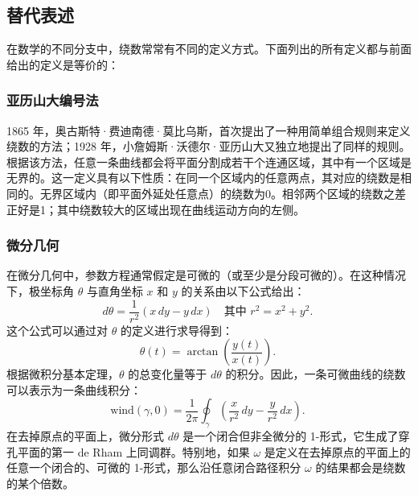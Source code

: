 \subsection{替代表述}
在数学的不同分支中，绕数常常有不同的定义方式。下面列出的所有定义都与前面给出的定义是等价的：
\subsubsection{亚历山大编号法}
1865 年，奥古斯特·费迪南德·莫比乌斯，首次提出了一种用简单组合规则来定义绕数的方法；1928 年，小詹姆斯·沃德尔·亚历山大又独立地提出了同样的规则。根据该方法，任意一条曲线都会将平面分割成若干个连通区域，其中有一个区域是无界的。这一定义具有以下性质：在同一个区域内的任意两点，其对应的绕数是相同的。无界区域内（即平面外延处任意点）的绕数为0。相邻两个区域的绕数之差正好是1；其中绕数较大的区域出现在曲线运动方向的左侧。
\subsubsection{微分几何}
在微分几何中，参数方程通常假定是可微的（或至少是分段可微的）。在这种情况下，极坐标角 $\theta$ 与直角坐标 $x$ 和 $y$ 的关系由以下公式给出：
$$
d\theta = \frac{1}{r^{2}}\left(x\,dy - y\,dx\right)
\quad\text{其中 } r^{2} = x^{2} + y^{2}.~
$$
这个公式可以通过对 $\theta$ 的定义进行求导得到：
$$
\theta(t) = \arctan\!\left(\frac{y(t)}{x(t)}\right).~
$$
根据微积分基本定理，$\theta$ 的总变化量等于 $d\theta$ 的积分。因此，一条可微曲线的绕数可以表示为一条曲线积分：
$$
\text{wind}(\gamma, 0) = 
\frac{1}{2\pi} 
\oint_{\gamma} 
\left(\frac{x}{r^{2}}\,dy - \frac{y}{r^{2}}\,dx\right).~
$$
在去掉原点的平面上，微分形式 $d\theta$ 是一个闭合但非全微分的 1-形式，它生成了穿孔平面的第一 de Rham 上同调群。特别地，如果 $\omega$ 是定义在去掉原点的平面上的任意一个闭合的、可微的 1-形式，那么沿任意闭合路径积分 $\omega$ 的结果都会是绕数的某个倍数。
